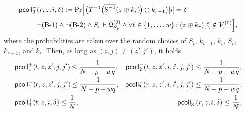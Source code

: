 \documentclass[journal=tosc,final,nohyperref]{iacrtrans}
\begin{document}
\begin{lemma}
{\begin{align*}
	&\mathsf{pcoll}_{3}^-(r,z,i,\delta)      :={\Pr}\Big[\big(T^{-1}\big(\overline{S_r^{-1}}(z\oplus k_r)\big)\oplus k_{r-1}\big)[i]=\delta    \\
	&\ \ \ \ \ ~\Big|~\neg\text{(B-1)}\wedge\neg\text{(B-2)}\wedge S_r\vdash\mathcal{Q}_{S_r}^{(0)}\wedge\forall\ell\in\{1,\ldots,w\}:(z\oplus k_r)[\ell]\notin V_r^{(0)}\Big],
	\end{align*}
}%
	where the probabilities are taken over the random choices of $S_t$, $k_{t-1}$, $k_t$, $S_r$, $k_{r-1}$, and $k_r$. Then, as long as $(z,j)\neq(z',j')$, it holds
	\begin{align}
	&\mathsf{pcoll}_{1}^+(t,z,z',j,j')\leq\frac{1}{N-p-wq},  &\mathsf{pcoll}_{2}^+(t,z,z',i,i',j,j')\leq\frac{1}{N-p-wq},    \notag    \\
	&\mathsf{pcoll}_{1}^-(r,z,z',j,j')\leq\frac{1}{N-p-wq},  &\mathsf{pcoll}_{2}^-(r,z,z',i,i',j,j')\leq\frac{1}{N-p-wq}.    \notag   \\
	&\mathsf{pcoll}_{3}^+(t,z,i,\delta)\leq\frac{1}{N}, 
	&\mathsf{pcoll}_{3}^-(r,z,i,\delta)\leq\frac{1}{N}.    \notag
	\end{align}
\end{lemma}
\end{document}
